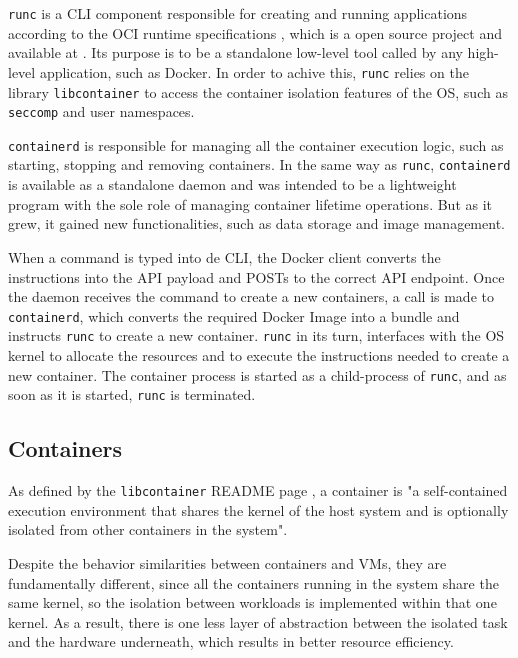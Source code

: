 \texttt{runc} is a \ac{CLI} component responsible for creating and running applications according to the \ac{OCI} runtime specifications \cite{oci-runc}, which is a open source project and available at \cite{git-runc}. Its purpose is to be a standalone low-level tool called by any high-level application, such as Docker. In order to achive this, \texttt{runc} relies on the library \texttt{libcontainer} to access the container isolation features of the \ac{OS}, such as \texttt{seccomp} and user namespaces\cite{runc-estes}.

\texttt{containerd} is responsible for managing all the container execution logic, such as starting, stopping and removing containers. In the same way as \texttt{runc}, \texttt{containerd} is available as a standalone daemon and was intended to be a lightweight program with the sole role of managing container lifetime operations. But as it grew, it gained new functionalities, such as data storage and image management\cite{docker-containerd}.

When a command is typed into de \ac{CLI}, the Docker client converts the instructions into the \ac{API} payload and POSTs to the correct API endpoint. Once the daemon receives the command to create a new containers, a call is made to \texttt{containerd}, which converts the required Docker Image into a bundle and instructs \texttt{runc} to create a new container. \texttt{runc} in its turn, interfaces with the \ac{OS} kernel to allocate the resources and to execute the instructions needed to create a new container. The container process is started as a child-process of \texttt{runc}, and as soon as it is started, \texttt{runc} is terminated.

\subsection{Containers}
\label{ssec::arch:containers}
As defined by the \texttt{libcontainer} README page \cite{docker-libcontainer}, a container is "a self-contained execution environment that shares the kernel of the host system and is optionally isolated from other containers in the system".

Despite the behavior similarities between containers and \acp{VM}, they are fundamentally different, since all the containers running in the system share the same kernel, so the isolation between workloads is implemented within that one kernel. As a result, there is one less layer of abstraction between the isolated task and the hardware underneath, which results in better resource efficiency.

